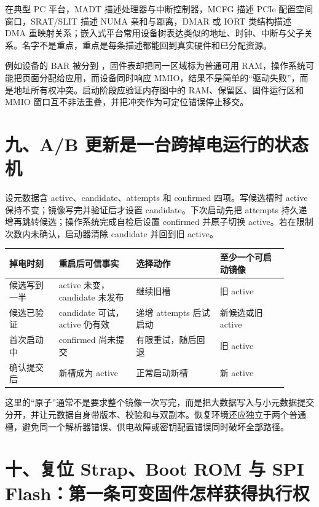 在典型 PC 平台，MADT 描述处理器与中断控制器，MCFG 描述 PCIe 配置空间窗口，SRAT/SLIT 描述 NUMA 亲和与距离，DMAR 或 IORT 类结构描述 DMA 重映射关系；嵌入式平台常用设备树表达类似的地址、时钟、中断与父子关系。名字不是重点，重点是每条描述都能回到真实硬件和已分配资源。

例如设备的 BAR 被分到 ，固件表却把同一区域标为普通可用 RAM，操作系统可能把页面分配给应用，而设备同时响应 MMIO，结果不是简单的“驱动失败”，而是地址所有权冲突。启动阶段应验证内存图中的 RAM、保留区、固件运行区和 MMIO 窗口互不非法重叠，并把冲突作为可定位错误停止移交。

\section{九、A/B 更新是一台跨掉电运行的状态机}

设元数据含 active、candidate、attempts 和 confirmed 四项。写候选槽时 active 保持不变；镜像写完并验证后才设置 candidate。下次启动先把 attempts 持久递增再跳转候选；操作系统完成自检后设置 confirmed 并原子切换 active。若在限制次数内未确认，启动器清除 candidate 并回到旧 active。

\begin{longtable}{L{0.16\linewidth}L{0.25\linewidth}L{0.27\linewidth}L{0.22\linewidth}}
\toprule
掉电时刻 & 重启后可信事实 & 选择动作 & 至少一个可启动镜像 \\
\midrule
候选写到一半 & active 未变，candidate 未发布 & 继续旧槽 & 旧 active \\\tablerowrule
候选已验证 & candidate 可试，active 仍有效 & 递增 attempts 后试启动 & 新候选或旧 active \\\tablerowrule
首次启动中 & confirmed 尚未提交 & 有限重试，随后回退 & 旧 active \\\tablerowrule
确认提交后 & 新槽成为 active & 正常启动新槽 & 新 active \\
\bottomrule
\end{longtable}

这里的“原子”通常不是要求整个镜像一次写完，而是把大数据写入与小元数据提交分开，并让元数据自身带版本、校验和与双副本。恢复环境还应独立于两个普通槽，避免同一个解析器错误、供电故障或密钥配置错误同时破坏全部路径。








\section{十、复位 Strap、Boot ROM 与 SPI Flash：第一条可变固件怎样获得执行权}

